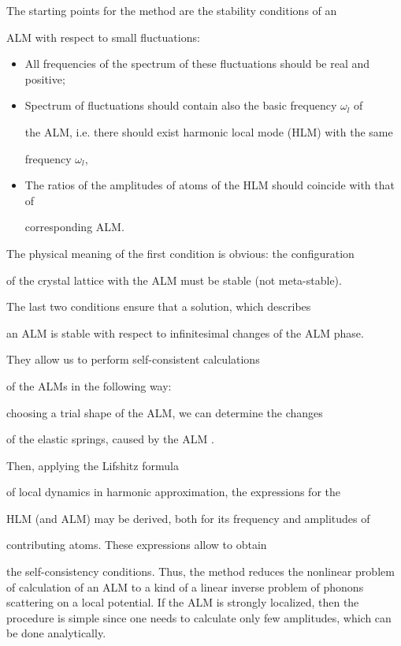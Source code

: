 The starting points for the method are the stability conditions of an

ALM with respect to small fluctuations:

\begin{itemize}

\item

All frequencies of the spectrum of these fluctuations should be real and positive;  

\item

Spectrum of fluctuations should contain also the basic frequency $\omega_l$ of

the ALM, i.e. there should exist harmonic local mode (HLM) with the same 

frequency $\omega_l$, 

\item

The ratios of the amplitudes of atoms of the HLM should coincide with that of 

corresponding ALM.  

\end{itemize}



The physical meaning of the first condition is obvious: the configuration 

of the crystal lattice with the ALM must be stable (not meta-stable). 

The last two conditions ensure that a solution, which describes  

an ALM is stable with respect to infinitesimal changes of the ALM phase. 

They allow us to perform self-consistent calculations

of the ALMs in the following way:

choosing a trial shape of the ALM, we can determine the changes

of the elastic springs, caused by the ALM \cite{kisgap}. 

Then, applying the Lifshitz formula

of local dynamics in harmonic approximation, the expressions for the

HLM (and ALM) may be derived, both for its frequency and amplitudes of 

contributing atoms. These expressions allow to obtain

the self-consistency conditions. Thus, the method reduces the nonlinear 
problem of calculation of an ALM to a kind of a linear inverse problem of phonons scattering on a local potential. If the ALM is strongly localized, 
then the procedure is simple since one needs to calculate only few 
amplitudes, which can be done analytically. 



